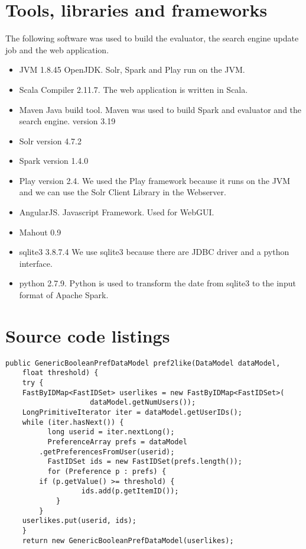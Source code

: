 \section{Tools, libraries and frameworks}

The following software was used to build the evaluator, the search engine update job and the web application.
\begin{itemize}
\item JVM 1.8.45 OpenJDK. Solr, Spark and Play run on the JVM.
\item Scala Compiler 2.11.7. The web application is written in Scala.
\item Maven Java build tool. Maven was used to build Spark and evaluator and the search engine. version 3.19
\item Solr version 4.7.2
\item Spark version 1.4.0
\item Play version 2.4. We used the Play framework because it runs on the JVM and we can use the Solr Client Library in the Webserver.
\item AngularJS. Javascript Framework. Used for WebGUI.
\item Mahout 0.9 
\item sqlite3 3.8.7.4 We use sqlite3 because there are JDBC driver and a python interface.
\item python 2.7.9. Python is used to transform the date from sqlite3 to the input format of Apache Spark.
\end{itemize}

\section{Source code listings}
\label{sec:listings}

\begin{lstlisting}[caption={To simulate the user action ``like'' we extract all ratings equal or above a score of 4.0 and use the result as training set},label={lst:pref2like}]
 public GenericBooleanPrefDataModel pref2like(DataModel dataModel,
	float threshold) {
	try {
	FastByIDMap<FastIDSet> userlikes = new FastByIDMap<FastIDSet>(
					dataModel.getNumUsers());
	LongPrimitiveIterator iter = dataModel.getUserIDs();
	while (iter.hasNext()) {
          long userid = iter.nextLong();
          PreferenceArray prefs = dataModel
		.getPreferencesFromUser(userid);
          FastIDSet ids = new FastIDSet(prefs.length());
          for (Preference p : prefs) {
		if (p.getValue() >= threshold) {
                  ids.add(p.getItemID());
			}
		}
	userlikes.put(userid, ids);
	}
    return new GenericBooleanPrefDataModel(userlikes);
\end{lstlisting}


